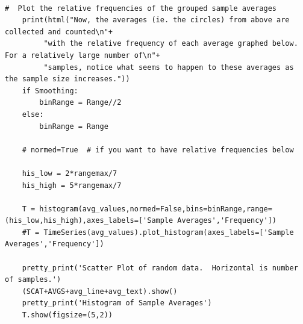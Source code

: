 \documentclass[10pt,]{book}
\theoremstyle{plain}
\theoremstyle{definition}
\theoremstyle{definition}
\numberwithin{equation}{section}
\begin{document}
\begin{lstlisting}[style=sageinput]
    
#  Plot the relative frequencies of the grouped sample averages
    print(html("Now, the averages (ie. the circles) from above are collected and counted\n"+
         "with the relative frequency of each average graphed below.  For a relatively large number of\n"+
         "samples, notice what seems to happen to these averages as the sample size increases."))
    if Smoothing:
        binRange = Range//2
    else:
        binRange = Range
    
    # normed=True  # if you want to have relative frequencies below
    
    his_low = 2*rangemax/7
    his_high = 5*rangemax/7
    
    T = histogram(avg_values,normed=False,bins=binRange,range=(his_low,his_high),axes_labels=['Sample Averages','Frequency']) 
    #T = TimeSeries(avg_values).plot_histogram(axes_labels=['Sample Averages','Frequency'])   
    
    pretty_print('Scatter Plot of random data.  Horizontal is number of samples.')
    (SCAT+AVGS+avg_line+avg_text).show()
    pretty_print('Histogram of Sample Averages')
    T.show(figsize=(5,2))
\end{lstlisting}
\end{document}
